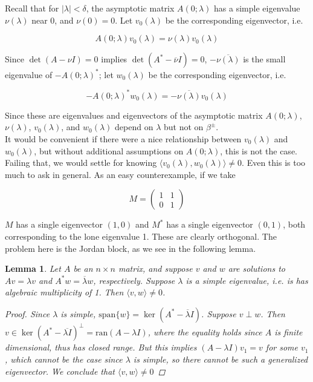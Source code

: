 \documentclass[12pt]{article}
\newtheorem{lemma}{Lemma}
\begin{document}
Recall that for $|\lambda| < \delta$, the asymptotic matrix $A(0; \lambda)$ has a simple eigenvalue $\nu(\lambda)$ near 0, and $\nu(0) = 0$. Let $v_0(\lambda)$ be the corresponding eigenvector, i.e.

\begin{equation}\label{defv0}
A(0; \lambda) v_0(\lambda) = \nu(\lambda) v_0(\lambda)
\end{equation}

Since $\det(A - \nu I) = 0$ implies $\det(A^* - \overline{\nu}I) = 0$, $-\overline{\nu(\lambda)}$ is the small eigenvalue of $-A(0; \lambda)^*$; let $w_0(\lambda)$ be the corresponding eigenvector, i.e.

\begin{equation}\label{defw0}
-A(0; \lambda)^* w_0(\lambda) = -\overline{\nu(\lambda)} v_0(\lambda)
\end{equation}

Since these are eigenvalues and eigenvectors of the asymptotic matrix $A(0; \lambda)$, $\nu(\lambda)$, $v_0(\lambda)$, and $w_0(\lambda)$ depend on $\lambda$ but not on $\beta^\pm$.\\

It would be convenient if there were a nice relationship between $v_0(\lambda)$ and $w_0(\lambda)$, but without additional assumptions on $A(0; \lambda)$, this is not the case. Failing that, we would settle for knowing $\langle v_0(\lambda), w_0(\lambda) \rangle \neq 0$. Even this is too much to ask in general. As an easy counterexample, if we take

\[
M = \begin{pmatrix}1 & 1 \\ 0 & 1 \end{pmatrix}
\]

$M$ has a single eigenvector $(1, 0)$ and $M^*$ has a single eigenvector $(0, 1)$, both corresponding to the lone eigenvalue 1. These are clearly orthogonal. The problem here is the Jordan block, as we see in the following lemma.


\begin{lemma}\label{perpeigs}
Let $A$ be an $n \times n$ matrix, and suppose $v$ and $w$ are solutions to $Av = \lambda v$ and $A^*w = \overline{\lambda}w$, respectively. Suppose $\lambda$ is a simple eigenvalue, i.e. is has algebraic multiplicity of 1. Then $\langle v, w \rangle \neq 0$.
\begin{proof}
Since $\lambda$ is simple, $\text{span} \{w\} = \ker(A^* - \overline{\lambda}I)$. Suppose $v \perp w$. Then $v \in \ker(A^* - \overline{\lambda I})^\perp = \text{ran}(A - \lambda I)$, where the equality holds since $A$ is finite dimensional, thus has closed range. But this implies $(A - \lambda I)v_1 = v$ for some $v_1$, which cannot be the case since $\lambda$ is simple, so there cannot be such a generalized eigenvector. We conclude that $\langle v, w \rangle \neq 0$
\end{proof}
\end{lemma}
\end{document}
